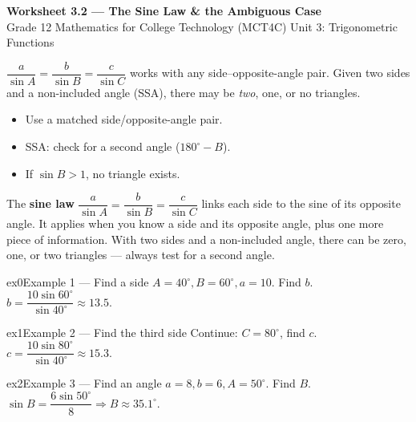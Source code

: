 \documentclass[11pt]{article}
\begin{document}
\begin{center}
{\LARGE\bfseries\color{titleblue}Worksheet 3.2 --- The Sine Law \& the Ambiguous Case}\\[2pt]
{\small Grade 12 Mathematics for College Technology (MCT4C) \textperiodcentered{} Unit 3: Trigonometric Functions}
\end{center}

\begin{ideabox}
$\dfrac{a}{\sin A}=\dfrac{b}{\sin B}=\dfrac{c}{\sin C}$ works with any side–opposite-angle pair. Given two sides and a non-included angle (SSA), there may be \emph{two}, one, or no triangles.
\begin{itemize}[leftmargin=*,itemsep=2pt]
  \item Use a matched side/opposite-angle pair.
  \item SSA: check for a second angle ($180^\circ-B$).
  \item If $\sin B>1$, no triangle exists.
\end{itemize}
\end{ideabox}

\begin{learnbox}
The \textbf{sine law} $\dfrac{a}{\sin A}=\dfrac{b}{\sin B}=\dfrac{c}{\sin C}$ links each side to the sine of its opposite angle.
It applies when you know a side and its opposite angle, plus one more piece of information.
With two sides and a non-included angle, there can be zero, one, or two triangles — always test for a second angle.
\end{learnbox}


\begin{example}{ex0}{Example 1 --- Find a side}
$A=40^\circ,B=60^\circ,a=10$. Find $b$.\soln $b=\dfrac{10\sin60^\circ}{\sin40^\circ}\approx13.5$.
\end{example}

\begin{example}{ex1}{Example 2 --- Find the third side}
Continue: $C=80^\circ$, find $c$.\soln $c=\dfrac{10\sin80^\circ}{\sin40^\circ}\approx15.3$.
\end{example}

\begin{example}{ex2}{Example 3 --- Find an angle}
$a=8,b=6,A=50^\circ$. Find $B$.\soln $\sin B=\dfrac{6\sin50^\circ}{8}\Rightarrow B\approx35.1^\circ$.
\end{example}
\end{document}
